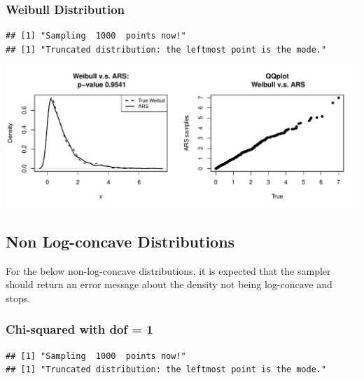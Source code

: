 \documentclass{article}\usepackage[]{graphicx}\usepackage[]{color}
\makeatletter
\def\maxwidth{ %
  \ifdim\Gin@nat@width>\linewidth
    \linewidth
  \else
    \Gin@nat@width
  \fi
}
\newenvironment{kframe}{%
 \def\at@end@of@kframe{}%
 \ifinner\ifhmode%
  \def\at@end@of@kframe{\end{minipage}}%
  \begin{minipage}{\columnwidth}%
 \fi\fi%
 \def\FrameCommand##1{\hskip\@totalleftmargin \hskip-\fboxsep
 \colorbox{shadecolor}{##1}\hskip-\fboxsep
     \hskip-\linewidth \hskip-\@totalleftmargin \hskip\columnwidth}%
 \MakeFramed {\advance\hsize-\width
   \@totalleftmargin\z@ \linewidth\hsize
   \@setminipage}}%
 {\par\unskip\endMakeFramed%
 \at@end@of@kframe}
\newenvironment{knitrout}{}{} %
\makeatother
\begin{document}
\subsubsection{Weibull Distribution}
\begin{knitrout}
\color{fgcolor}\begin{kframe}
\begin{verbatim}
## [1] "Sampling  1000  points now!"
## [1] "Truncated distribution: the leftmost point is the mode."
\end{verbatim}
\end{kframe}
\includegraphics[width=\maxwidth]{figure/weibull-1} 

\end{knitrout}


\subsection{Non Log-concave Distributions}
For the below non-log-concave distributions, it is expected that the sampler
should return an error message about the density not being log-concave and
stops.
\subsubsection{Chi-squared with dof = 1}
\begin{knitrout}
\color{fgcolor}\begin{kframe}
\begin{verbatim}
## [1] "Sampling  1000  points now!"
## [1] "Truncated distribution: the leftmost point is the mode."
\end{verbatim}


{\ttfamily\noindent\bfseries\color{errorcolor}{\#\# Error in ars(chisq\_pdf, n, 0.001, Inf): Bad density: not log-concave}}\end{kframe}
\end{knitrout}
\end{document}
